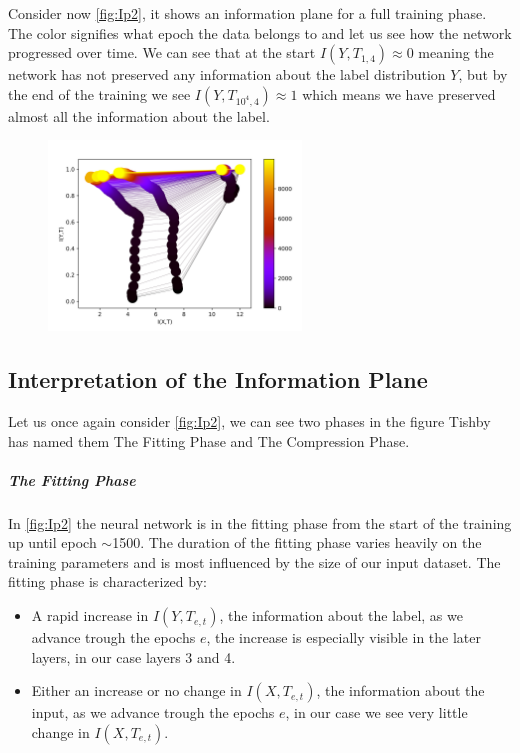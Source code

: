 Consider now \autoref{fig:Ip2}, it shows an information plane for a full
training phase. The color signifies what epoch the data belongs to and let us
see how the network progressed over time. We can see that at the start $I(Y,
T_{1,4}) \approx 0$ meaning the network has not preserved any information about
the label distribution $Y$, but by the end of the training we see $I(Y,
T_{10^4,4}) \approx 1$ which means we have preserved almost all the information
about the label.


\begin{figure}[H]
  \centering
  \includegraphics[width=0.60\textwidth]{figs/ip_10000.png}
  \label{fig:Ip2}
\end{figure}

\subsection{Interpretation of the Information Plane}

Let us once again consider \autoref{fig:Ip2}, we can see two phases in the figure
Tishby has named them The Fitting Phase and The Compression Phase.

\subparagraph{The Fitting Phase} In \autoref{fig:Ip2} the neural network is in
the fitting phase from the start of the training up until epoch $\sim$1500. The
duration of the fitting phase varies heavily on the training parameters and is
most influenced by the size of our input dataset. The fitting phase is
characterized by:
\begin{itemize}
  \item{
      A rapid increase in $I(Y, T_{e,t})$, the information about the label, as we
      advance trough the epochs $e$, the increase is especially visible in the
      later layers, in our case layers 3 and 4.
    }
  \item{
      Either an increase or no change in $I(X, T_{e,t})$, the information about
      the input, as we advance trough the epochs $e$, in our case we see very
      little change in $I(X,T_{e,t})$.
    }
\end{itemize}

